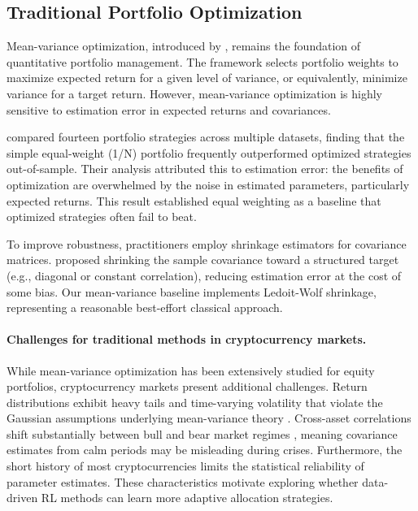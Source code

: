 \subsection{Traditional Portfolio Optimization}
\label{subsec:traditional}

Mean-variance optimization, introduced by \citet{markowitz1952portfolio}, remains the foundation of quantitative portfolio management. The framework selects portfolio weights to maximize expected return for a given level of variance, or equivalently, minimize variance for a target return. However, mean-variance optimization is highly sensitive to estimation error in expected returns and covariances.

\citet{demiguel2009optimal} compared fourteen portfolio strategies across multiple datasets, finding that the simple equal-weight (1/N) portfolio frequently outperformed optimized strategies out-of-sample. Their analysis attributed this to estimation error: the benefits of optimization are overwhelmed by the noise in estimated parameters, particularly expected returns. This result established equal weighting as a baseline that optimized strategies often fail to beat.

To improve robustness, practitioners employ shrinkage estimators for covariance matrices. \citet{ledoit2004honey} proposed shrinking the sample covariance toward a structured target (e.g., diagonal or constant correlation), reducing estimation error at the cost of some bias. Our mean-variance baseline implements Ledoit-Wolf shrinkage, representing a reasonable best-effort classical approach.

\paragraph{Challenges for traditional methods in cryptocurrency markets.} While mean-variance optimization has been extensively studied for equity portfolios, cryptocurrency markets present additional challenges. Return distributions exhibit heavy tails and time-varying volatility that violate the Gaussian assumptions underlying mean-variance theory \cite{bergsli2022volatility, naimy2021garch}. Cross-asset correlations shift substantially between bull and bear market regimes \cite{james2022correlations}, meaning covariance estimates from calm periods may be misleading during crises. Furthermore, the short history of most cryptocurrencies limits the statistical reliability of parameter estimates. These characteristics motivate exploring whether data-driven RL methods can learn more adaptive allocation strategies.

